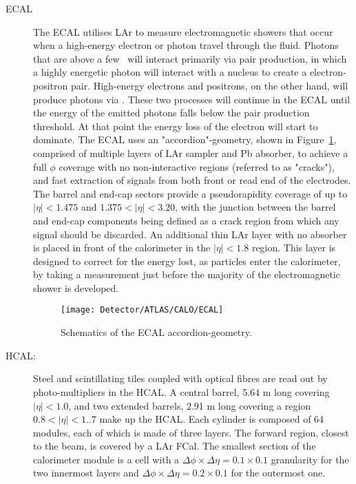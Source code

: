	\begin{description}
	\item[\ac{ECAL}]
	The \ac{ECAL} utilises \ac{LAr} to measure electromagnetic showers that occur when a high-energy electron or photon travel through the fluid. 
	Photons that are above a few \mev\ will interact primarily via pair production, in which a highly energetic photon will interact with a nucleus to create a electron-positron pair. High-energy electrons and positrons, on the other hand, will produce photons via \brem. 
	These two processes will continue in the \ac{ECAL} until the energy of the emitted photons falls below the pair production threshold. At that point the energy loss of the electron will start to dominate.
	The \ac{ECAL} uses an "accordion"-geometry, shown in Figure~\ref{fig:ECAL}, comprised of multiple layers of \ac{LAr} sampler and \ac{Pb} absorber, to achieve a full $\phi$ coverage with no non-interactive regions (referred to as "cracks"), and fast extraction of signals from both front or read end of the electrodes. 
	The barrel and end-cap sectors provide a pseudorapidity coverage of up to $|\eta|<1.475$ and $1.375<|\eta|<3.20$, with the junction between the barrel and end-cap components being defined as a crack region from which any signal should be discarded. 
	An additional thin \ac{LAr} layer with no absorber is placed in front of the calorimeter in the $|\eta|<1.8$ region. 
	This layer is designed to correct for the energy lost, as particles enter the calorimeter, by taking a measurement just before the majority of the electromagnetic shower is developed. 
	\begin{figure}[!hbt]
		\centering
		\texttt{[image: Detector/ATLAS/CALO/ECAL]}
		\caption{Schematics of the \ac{ECAL} accordion-geometry.}
		\label{fig:ECAL}
		\end{figure}
		
	\item[\ac{HCAL}: ]
	Steel and scintillating tiles coupled with optical fibres are read out by photo-multipliers in the \ac{HCAL}.
	A central barrel, 5.64 m long covering $|\eta|<1.0$, and two extended barrels, 2.91 m long covering a region $0.8<|\eta|<1..7$ make up the \ac{HCAL}. 
	Each cylinder is composed of 64 modules, each of which is made of three layers. 
	The forward region, closest to the beam, is covered by a \ac{LAr} \ac{FCal}.
	The smallest section of the calorimeter module is a cell with a $\Delta\phi\times\Delta\eta=0.1\times0.1$ granularity for the two innermost layers and  $\Delta\phi\times\Delta\eta=0.2\times0.1$ for the outermost one.
	\end{description}
